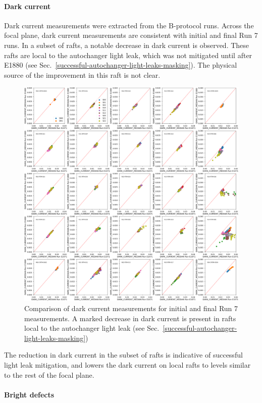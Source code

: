 \paragraph{Dark current}\label{sec:finaldark-current}

Dark current measurements were extracted from the B-protocol runs. Across the focal plane, dark current measurements are consistent with initial and final Run 7 runs. In a subset of rafts, a notable decrease in dark current is observed. These rafts are local to the autochanger light leak, which was not mitigated until after E1880 (see Sec.~\ref{successful-autochanger-light-leaks-masking}). The physical source of the improvement in this raft is not clear.

\begin{figure}[ht]
    \centering
    \includegraphics[width=0.7\linewidth]{figures/finalCharacterization/E1071_E1880_DARK_CURRENT_MEDIAN.png}
    \caption{Comparison of dark current measurements for initial and final Run 7 measurements. A marked decrease in dark current is present in rafts local to the autochanger light leak (see Sec.~\ref{successful-autochanger-light-leaks-masking})}
    \label{fig:finalChar-DarkCurrent-5x5}
\end{figure}

The reduction in dark current in the subset of rafts is indicative of successful light leak mitigation, and lowers the dark current on local rafts to levels similar to the rest of the focal plane.
\clearpage

\paragraph{Bright defects}\label{final-bright-defects}

